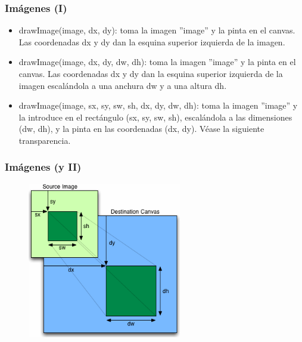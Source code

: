 
\begin{frame}
\frametitle{Imágenes (I)}

\begin{itemize}
  \item drawImage(image, dx, dy): toma la imagen ''image'' y la pinta en el canvas. Las coordenadas dx y dy dan la esquina superior izquierda de la imagen.
  \item drawImage(image, dx, dy, dw, dh): toma la imagen ''image'' y la pinta en el canvas. Las coordenadas dx y dy dan la esquina superior izquierda de la imagen escalándola a una anchura dw y a una altura dh.
  \item drawImage(image, sx, sy, sw, sh, dx, dy, dw, dh): toma la imagen ''image'' y la introduce en el rectángulo (sx, sy, sw, sh), escalándola a las dimensiones (dw, dh), y la pinta en las coordenadas (dx, dy). Véase la siguiente transparencia.
\end{itemize}

\end{frame}


\begin{frame}
\frametitle{Imágenes (y II)}

\begin{center}
\begin{figure}[p]
\includegraphics[width=0.6\textwidth]{figs/drawImage.png}
\end{figure}
\end{center}

\end{frame}


